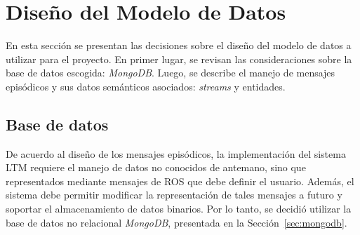 
\section{Diseño del Modelo de Datos}\label{sec:data_model_design}

En esta sección se presentan las decisiones sobre el diseño del modelo de datos a utilizar para el proyecto. En primer lugar, se revisan las consideraciones sobre la base de datos escogida: \textit{MongoDB}. Luego, se describe el manejo de mensajes episódicos y sus datos semánticos asociados: \textit{streams} y entidades.


\subsection{Base de datos}

De acuerdo al diseño de los mensajes episódicos, la implementación del sistema LTM requiere el manejo de datos no conocidos de antemano, sino que representados mediante mensajes de ROS que debe definir el usuario. Además, el sistema debe permitir modificar la representación de tales mensajes a futuro y soportar el almacenamiento de datos binarios. Por lo tanto, se decidió utilizar la base de datos no relacional \textit{MongoDB}, presentada en la Sección~\ref{sec:mongodb}. 


